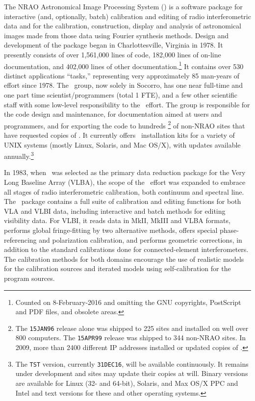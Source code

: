     The NRAO Astronomical Image Processing System (\AIPS{})
is a software package for interactive (and, optionally, batch)
calibration and editing of radio interferometric data and for the
calibration, construction, display and analysis of astronomical images
made from those data using Fourier synthesis methods.  Design and
development of the package began in Charlottesville, Virginia in 1978.
It presently consists of over 1,561,000 lines of code, 182,000 lines
of on-line documentation, and 402,000 lines of other
documentation.\footnote{Counted on 8-February-2016 and omitting the
GNU copyrights, PostScript and PDF files, and obsolete areas.}  It
contains over 530 distinct applications ``tasks,'' representing very
approximately 85 man-years of effort since 1978.  The \AIPS\ group,
now solely in Socorro, has one near full-time and one part time
scientist/programmers (total 1 FTE), and a few other scientific staff
with some low-level responsibility to the \AIPS\ effort.  The group is
responsible for the code design and maintenance, for documentation
aimed at users and programmers, and for exporting the code to hundreds
\footnote{The {\tt 15JAN96} release alone was shipped to 225 sites and
installed on well over 800 computers.  The {\tt 15APR99} release was
shipped to 344 non-NRAO sites.  In 2009, more than 2400 different IP
addresses installed or updated copies of \AIPS\@.} of non-NRAO sites
that have requested copies of \AIPS\@.  It currently offers \AIPS\
installation kits for a variety of UNIX systems (mostly Linux,
Solaris, and Mac OS/X), with updates available annually.\footnote{The
{\tt TST} version, currently {\tt 31DEC16}, will be available
continuously. It remains under development and sites may update their
copies at will.  Binary versions are available for Linux (32- and
64-bit), Solaris, and Max OS/X PPC and Intel and text versions for
these and other operating systems.}

    In 1983, when \AIPS\ was selected as the primary data reduction
package for the Very Long Baseline Array (VLBA), the scope of the \AIPS\
effort was expanded to embrace all stages of radio interferometric
calibration, both continuum and spectral line.  The \AIPS\ package
contains a full suite of calibration and editing functions for both
VLA and VLBI data, including interactive and batch methods for editing
visibility data.  For VLBI, it reads data in MkII, MkIII and VLBA
formats, performs global fringe-fitting by two alternative methods,
offers special phase-referencing and polarization calibration, and
performs geometric corrections, in addition to the standard
calibrations done for connected-element interferometers.  The
calibration methods for both domains encourage the use of realistic
models for the calibration sources and iterated models using
self-calibration for the program sources.

